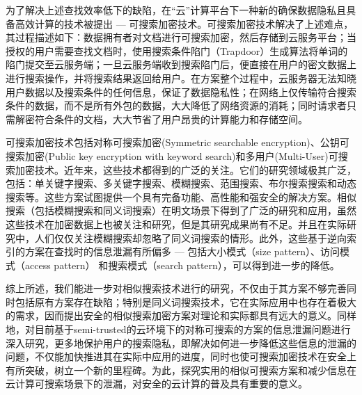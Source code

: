 为了解决上述查找效率低下的缺陷，在“云”计算平台下一种新的确保数据隐私且具备高效计算的技术被提出 --- 可搜索加密技术。可搜索加密技术解决了上述难点，其过程描述如下：数据拥有者对文档进行可搜索加密，然后存储到云服务平台；当授权的用户需要查找文档时，使用搜索条件陷门（Trapdoor）生成算法将单词的陷门提交至云服务端；一旦云服务端收到搜索陷门后，便直接在用户的密文数据上进行搜索操作，并将搜索结果返回给用户。在方案整个过程中，云服务器无法知晓用户数据以及搜索条件的任何信息，保证了数据隐私性；在网络上仅传输符合搜索条件的数据，而不是所有外包的数据，大大降低了网络资源的消耗；同时请求者只需解密符合条件的文档，大大节省了用户昂贵的计算能力和存储空间。


可搜索加密技术包括对称可搜索加密(Symmetric searchable encryption)、公钥可搜索加密(Public key encryption with keyword search)和多用户(Multi-User)可搜索加密技术。近年来，这些技术都得到的广泛的关注。它们的研究领域极其广泛，包括：单关键字搜索、多关键字搜索、模糊搜索、范围搜索、布尔搜索搜索和动态搜索等。这些方案试图提供一个具有完备功能、高性能和强安全的解决方案。相似搜索（包括模糊搜索和同义词搜索\cite{grefenstette1994explorations}）在明文场景下得到了广泛的研究和应用，虽然这些技术在加密数据上也被关注和研究，但是其研究成果尚有不足。并且在实际研究中，人们仅仅关注模糊搜索却忽略了同义词搜索的情形。此外，这些基于逆向索引的方案在查找时的信息泄漏有所偏多 --- 包括大小模式（size pattern）、访问模式（access pattern） 和搜索模式（search pattern），可以得到进一步的降低。

综上所述，我们能进一步对相似搜索技术进行的研究，不仅由于其方案不够完善同时包括原有方案存在缺陷；特别是同义词搜索技术，它在实际应用中也存在着极大的需求，因而提出安全的相似搜索加密方案对理论和实际都具有远大的意义。同样地，对目前基于semi-trusted的云环境下的对称可搜索的方案的信息泄漏问题进行深入研究，更多地保护用户的搜索隐私，即解决如何进一步降低这些信息的泄漏的问题，不仅能加快推进其在实际中应用的进度，同时也使可搜索加密技术在安全上有所突破，树立一个新的里程碑。为此，探究实用的相似可搜索方案和减少信息在云计算可搜索场景下的泄漏，对安全的云计算的普及具有重要的意义。




